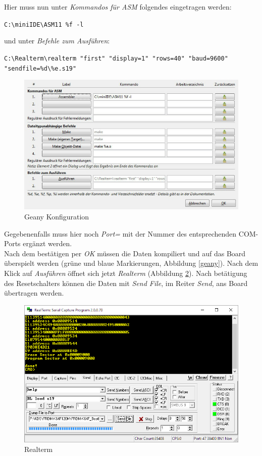     Hier muss nun unter \textit{Kommandos für ASM} folgendes eingetragen werden:
    \begin{center}
        \texttt{C:\textbackslash{}miniIDE\textbackslash{}ASM11 \%f -l}
    \end{center}
    und unter \textit{Befehle zum Ausführen}:
    \begin{center}
        \texttt{C:\textbackslash{}Realterm\textbackslash{}realterm "{}first"{} "{}display=1"{} "{}rows=40"{} "{}baud=9600"{} "{}sendfile=\%d\textbackslash{}\%e.s19"{}}
    \end{center}
    \begin{figure}[H]
        \centering
        \label{geany-config}
        \includegraphics[scale=0.5]{img/geany-config.png}    
        \caption{Geany Konfiguration}
    \end{figure}
    Gegebenenfalls muss hier noch \textit{Port=} mit der Nummer des entsprechenden COM-Ports ergänzt werden.
    \\
    Nach dem bestätigen per \textit{OK} müssen die Daten kompiliert und auf das Board überspielt werden (grüne und blaue Markierungen, Abbildung \ref{geany}).
    Nach dem Klick auf \textit{Ausführen} öffnet sich jetzt \textit{Realterm} (Abbildung \ref{realterm}). Nach betätigung des Resetschalters können die Daten mit 
    \textit{Send File}, im Reiter \textit{Send}, ans Board übertragen werden. 
    \begin{figure}[H]
        \centering
        \label{realterm}
        \includegraphics[scale=0.5]{img/realterm.png}    
        \caption{Realterm}
    \end{figure}

